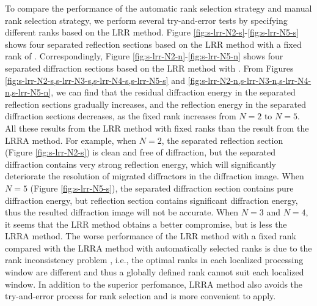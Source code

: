 To compare the performance of the automatic rank selection strategy and manual rank selection strategy, we perform several try-and-error tests by specifying different ranks based on the LRR method. Figure \ref{fig:s-lrr-N2-s}-\ref{fig:s-lrr-N5-s} shows four separated reflection sections based on the LRR method with a fixed rank of . Correspondingly, Figure \ref{fig:s-lrr-N2-n}-\ref{fig:s-lrr-N5-n} shows four separated diffraction sections based on the LRR method with . From Figures \ref{fig:s-lrr-N2-s,s-lrr-N3-s,s-lrr-N4-s,s-lrr-N5-s} and \ref{fig:s-lrr-N2-n,s-lrr-N3-n,s-lrr-N4-n,s-lrr-N5-n}, we can find that the residual diffraction energy in the separated reflection sections gradually increases, and the reflection energy in the separated diffraction sections decreases, as the fixed rank increases from $N=2$ to $N=5$. All these results from the LRR method with fixed ranks  than the result from the LRRA method. For example, when $N=2$, the separated reflection section (Figure \ref{fig:s-lrr-N2-s}) is clean and free of diffraction, but the separated diffraction contains very strong reflection energy, which will significantly deteriorate the resolution of migrated diffractors in the diffraction image. When $N=5$ (Figure \ref{fig:s-lrr-N5-s}), the separated diffraction section contains pure diffraction energy, but  reflection section contains significant diffraction energy, thus the resulted diffraction image will not be accurate. When $N=3$ and $N=4$, it seems that the LRR method obtains a better compromise, but is less   the LRRA method. The worse performance of the LRR method with a fixed rank compared with the LRRA method with automatically selected ranks is due to the rank inconsistency problem \cite[]{shaohuan2017gji}, i.e., the optimal ranks in each localized processing window are different and thus a globally defined rank cannot suit each localized window. In addition to the superior perfomance, LRRA method also avoids the try-and-error process for rank selection and is more convenient to apply. 


